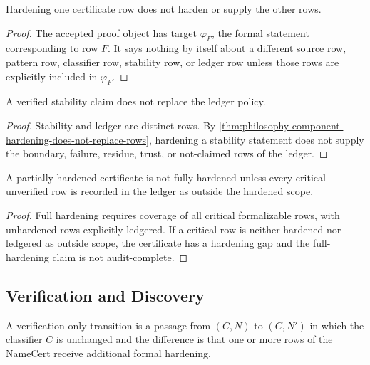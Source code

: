 \begin{theorem}
\label{thm:philosophy-component-hardening-does-not-replace-rows}
Hardening one certificate row does not harden or supply the other rows.
\end{theorem}
\begin{proof}
The accepted proof object has target $\varphi_F$, the formal statement
corresponding to row $F$. It says nothing by itself about a different
source row, pattern row, classifier row, stability row, or ledger row
unless those rows are explicitly included in $\varphi_F$.
\end{proof}

\begin{corollary}
\label{cor:philosophy-verified-stability-not-ledger}
A verified stability claim does not replace the ledger policy.
\end{corollary}
\begin{proof}
Stability and ledger are distinct rows. By
\autoref{thm:philosophy-component-hardening-does-not-replace-rows},
hardening a stability statement does not supply the boundary, failure,
residue, trust, or not-claimed rows of the ledger.
\end{proof}

\begin{theorem}
\label{thm:philosophy-partial-hardening-not-full-hardening}
A partially hardened certificate is not fully hardened unless every
critical unverified row is recorded in the ledger as outside the hardened
scope.
\end{theorem}
\begin{proof}
Full hardening requires coverage of all critical formalizable rows, with
unhardened rows explicitly ledgered. If a critical row is neither
hardened nor ledgered as outside scope, the certificate has a hardening
gap and the full-hardening claim is not audit-complete.
\end{proof}

\subsection{Verification and Discovery}
\label{subsec:philosophy-verification-and-discovery}

\begin{definition}
\label{def:philosophy-verification-only-transition}
A verification-only transition is a passage from $(C,N)$ to $(C,N')$ in
which the classifier $C$ is unchanged and the difference is that one or
more rows of the NameCert receive additional formal hardening.
\end{definition}

